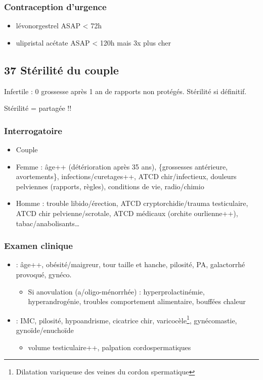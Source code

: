 \documentclass[11pt]{article}
\begin{document}
\subsubsection{Contraception d'urgence}
\label{sec:orgd8811fc}
\begin{itemize}
\item lévonorgestrel ASAP < 72h
\item ulipristal acétate ASAP < 120h mais 3x plus cher
\end{itemize}

\subsection{37 \textdagger{} Stérilité du couple}
\label{sec:org926952d}
Infertile : 0 grossesse après 1 an de rapports non protégés. Stérilité si
définitif.

Stérilité = partagée !!

\subsubsection{Interrogatoire}
\label{sec:orgb6eb358}
\begin{itemize}
\item Couple
\item Femme : âge++ (détérioration après 35 ans), \{grossesses antérieure,
avortements\}, infections/curetages++, ATCD chir/infectieux, douleurs
pelviennes (rapports, règles), conditions de vie, radio/chimio
\item Homme : trouble libido/érection, ATCD cryptorchidie/trauma testiculaire, ATCD
chir pelvienne/scrotale, ATCD médicaux (orchite ourlienne++), tabac/anabolisants\ldots{}
\end{itemize}

\subsubsection{Examen clinique}
\label{sec:orgb01bfff}
\begin{itemize}
\item \female : âge++, obésité/maigreur, tour taille et hanche, pilosité, PA,
galactorrhé provoqué, gynéco.
\begin{itemize}
\item Si anovulation (a/oligo-ménorrhée) : hyperprolactinémie, hyperandrogénie,
troubles comportement alimentaire, bouffées chaleur
\end{itemize}
\item \male : IMC, pilosité, hypoandrisme, cicatrice chir, varicocèle\footnote{Dilatation variqueuse des veines du cordon spermatique},
gynécomastie, gynoïde/enuchoïde
\begin{itemize}
\item volume testiculaire++, palpation cordospermatiques
\end{itemize}
\end{itemize}
\end{document}

